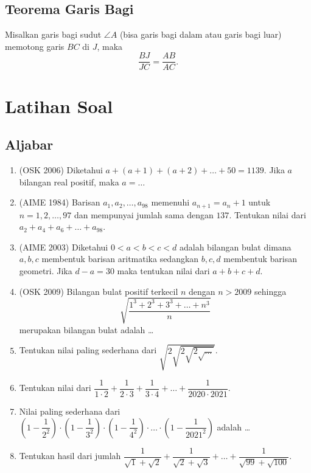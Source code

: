 \documentclass[11pt]{scrartcl}
\begin{document}
    \subsection{Teorema Garis Bagi}
    Misalkan garis bagi sudut $\angle A$ (bisa garis bagi dalam atau garis bagi luar) memotong garis $BC$ di $J$, maka 
    $$\dfrac{BJ}{JC} = \dfrac{AB}{AC}.$$
    
\section{Latihan Soal}

\subsection{Aljabar}
\begin{enumerate}
    \item (OSK 2006) Diketahui $a+(a+1)+(a+2)+\dots+50=1139$. Jika $a$ bilangan real positif, maka $a=\dots$
    
    \item (AIME 1984) Barisan $a_1,a_2,\dots,a_{98}$ memenuhi $a_{n+1}=a_n+1$ untuk $n=1,2,\dots,97$ dan mempunyai jumlah sama dengan $137$. Tentukan nilai dari $a_2+a_4+a_6+\dots+a_{98}$.
    
    \item (AIME 2003) Diketahui $0<a<b<c<d$ adalah bilangan bulat dimana $a,b,c$ membentuk barisan aritmatika sedangkan $b,c,d$ membentuk barisan geometri. Jika $d-a=30$ maka tentukan nilai dari $a+b+c+d$.
    
    \item (OSK 2009) Bilangan bulat positif terkecil $n$ dengan $n> 2009$ sehingga $$\sqrt{\dfrac{1^3+2^3+3^3+\dots+n^3}{n}}$$
    merupakan bilangan bulat adalah \dots
    
    \item Tentukan nilai paling sederhana dari $\sqrt{2\sqrt{2\sqrt{2\sqrt{\dots}}}}$.
    
    \item Tentukan nilai dari $\dfrac{1}{1\cdot2}+\dfrac{1}{2\cdot 3}+\dfrac{1}{3 \cdot 4}+\dots+\dfrac{1}{2020 \cdot 2021}.$
    
    \item  Nilai paling sederhana dari $\left(1-\dfrac{1}{2^2}\right)\cdot\left(1-\dfrac{1}{3^2}\right)\cdot\left(1-\dfrac{1}{4^2}\right)\cdot\dots\cdot\left(1-\dfrac{1}{2021^2}\right)$ adalah \dots
    
    \item Tentukan hasil dari jumlah $\dfrac{1}{\sqrt{1}+\sqrt{2}}+\dfrac{1}{\sqrt{2}+\sqrt{3}}+\dots+\dfrac{1}{\sqrt{99}+\sqrt{100}}.$
    

\end{enumerate}
\end{document}
